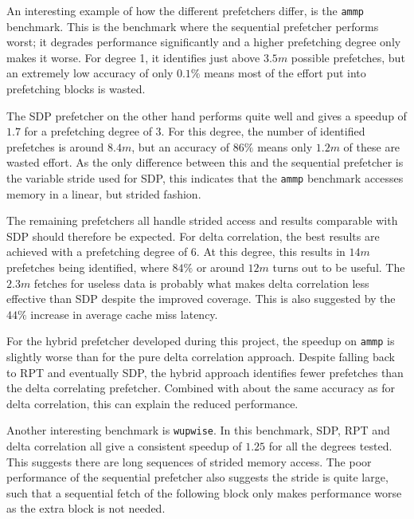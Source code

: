An interesting example of how the different prefetchers differ, is the \texttt{ammp} benchmark.
This is the benchmark where the sequential prefetcher performs worst;
it degrades performance significantly and a higher prefetching degree only makes
it worse.
For degree 1, it identifies just above $3.5m$ possible prefetches, but an
extremely low accuracy of only $0.1\%$ means most of the effort put into
prefetching blocks is wasted.

The SDP prefetcher on the other hand performs quite well and gives a speedup of
$1.7$ for a prefetching degree of $3$.
For this degree, the number of identified prefetches is around $8.4m$, but an
accuracy of $86\%$ means only $1.2m$ of these are wasted effort.
As the only difference between this and the sequential prefetcher is the
variable stride used for SDP, this indicates that the \texttt{ammp} benchmark
accesses memory in a linear, but strided fashion.

The remaining prefetchers all handle strided access and results comparable with
SDP should therefore be expected.
For delta correlation, the best results are achieved with a prefetching degree of $6$.
At this degree, this results in $14m$ prefetches being identified, where $84\%$
or around $12m$ turns out to be useful.
The $2.3m$ fetches for useless data is probably what makes delta correlation
less effective than SDP despite the improved coverage.
This is also suggested by the $44\%$ increase in average cache miss latency.

For the hybrid prefetcher developed during this project, the speedup on \texttt{ammp} is slightly
worse than for the pure delta correlation approach.
Despite falling back to RPT and eventually SDP, the hybrid approach identifies
fewer prefetches than the delta correlating prefetcher.
Combined with about the same accuracy as for delta correlation, this can explain
the reduced performance.

Another interesting benchmark is \texttt{wupwise}.
In this benchmark, SDP, RPT and delta correlation all give a consistent speedup
of $1.25$ for all the degrees tested.
This suggests there are long sequences of strided memory access.
The poor performance of the sequential prefetcher also suggests the stride is
quite large, such that a sequential fetch of the following block only makes
performance worse as the extra block is not needed.

